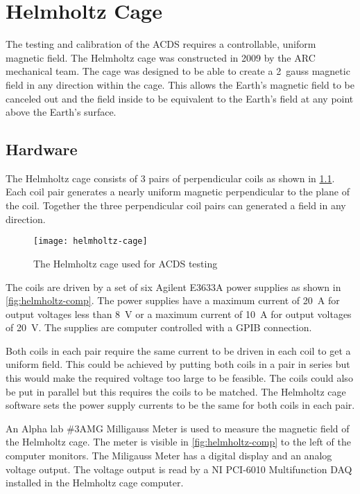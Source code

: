 

\chapter{Helmholtz Cage}

\label{ch:Helmholtz}

The testing and calibration of the \ac{ACDS} requires a controllable, uniform magnetic field. The Helmholtz cage was constructed in 2009 by the \ac{ARC} mechanical team. The cage was designed to be able to create a 2~gauss magnetic field in any direction within the cage. This allows the Earth's magnetic field to be canceled out and the field inside to be equivalent to the Earth's field at any point above the Earth's surface.

\section{Hardware}

The Helmholtz cage consists of 3 pairs of perpendicular coils as shown in \cref{fig:helmholtz}. Each coil pair generates a nearly uniform magnetic perpendicular to the plane of the coil. Together the three perpendicular coil pairs can generated a field in any direction.

\begin{figure}[!ht]
    \texttt{[image: helmholtz-cage]}
    \caption{The Helmholtz cage used for \acs{ACDS} testing}
    \label{fig:helmholtz}
\end{figure}

The coils are driven by a set of six Agilent E3633A power supplies as shown in \cref{fig:helmholtz-comp}. The power supplies have a maximum current of 20~A for output voltages less than 8~V or a maximum current of 10~A for output voltages of 20~V. The supplies are computer controlled with a \ac{GPIB} connection. 

Both coils in each pair require the same current to be driven in each coil to get a uniform field. This could be achieved by putting both coils in a pair in series but this would make the required voltage too large to be feasible. The coils could also be put in parallel but this requires the coils to be matched. The Helmholtz cage software sets the power supply currents to be the same for both coils in each pair.

An Alpha lab \#3AMG Milligauss Meter is used to measure the magnetic field of the Helmholtz cage. The meter is visible in \cref{fig:helmholtz-comp} to the left of the computer monitors. The Miligauss Meter has a digital display and an analog voltage output. The voltage output is read by a NI PCI-6010 Multifunction \ac{DAQ} installed in the Helmholtz cage computer.

